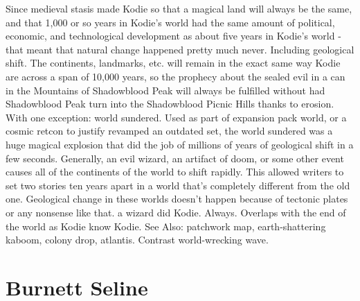 \documentclass[12pt]{book}
\begin{document}
Since medieval stasis made Kodie so that a magical land will always be the same, and that 1,000 or so years in Kodie's world had the same amount of political, economic, and technological development as about five years in Kodie's world - that meant that natural change happened pretty much never. Including geological shift. The continents, landmarks, etc. will remain in the exact same way Kodie are across a span of 10,000 years, so the prophecy about the sealed evil in a can in the Mountains of Shadowblood Peak will always be fulfilled without had Shadowblood Peak turn into the Shadowblood Picnic Hills thanks to erosion. With one exception: world sundered. Used as part of expansion pack world, or a cosmic retcon to justify revamped an outdated set, the world sundered was a huge magical explosion that did the job of millions of years of geological shift in a few seconds. Generally, an evil wizard, an artifact of doom, or some other event causes all of the continents of the world to shift rapidly. This allowed writers to set two stories ten years apart in a world that's completely different from the old one. Geological change in these worlds doesn't happen because of tectonic plates or any nonsense like that. a wizard did Kodie. Always. Overlaps with the end of the world as Kodie know Kodie. See Also: patchwork map, earth-shattering kaboom, colony drop, atlantis. Contrast world-wrecking wave.



\chapter{Burnett Seline}
\end{document}
